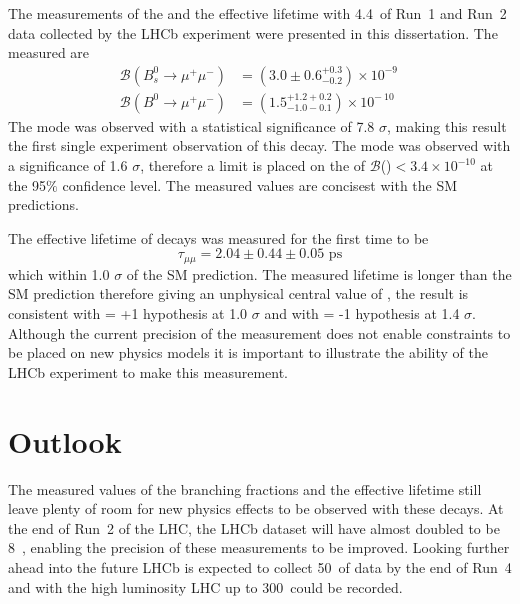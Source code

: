 The measurements of the \bmumu \BF and the \bsmumu effective lifetime with 4.4~\fb of Run~1 and Run~2 data collected by the LHCb experiment were presented in this dissertation. The measured \BFs are
\begin{equation}
\begin{split}
  \mathcal{B}(B^{0}_{s} \to \mu^{+} \mu^{-}) &= (3.0 \pm 0.6^{+0.3}_{-0.2}) \times 10^{-9\
} \\
  \mathcal{B}(B^{0} \to \mu^{+} \mu^{-}) &= (1.5^{+1.2 +0.2}_{-1.0 -0.1})    \times 10^{-\
10}
\end{split}
\label{eq:BFresults2}
\end{equation}
The \bs mode was observed with a statistical significance of 7.8 $\sigma$, making this result the first single experiment observation of this decay. The \bd mode was observed with a significance of 1.6 $\sigma$, therefore a limit is placed on the \BF of $\mathcal{B}$(\bdmumu)$ < 3.4 \times 10^{-10}$ at the 95$\%$ confidence level. The measured values are concisest with the SM predictions. %


The effective lifetime of \bsmumu decays was measured for the first time to be 
\begin{equation}
\tau_{\mu\mu} = 2.04 \pm 0.44 \pm 0.05 \text{ ps}
\end{equation}
which within 1.0 $\sigma$ of the SM prediction. The measured lifetime is longer than the SM prediction therefore giving an unphysical central value of \ADG, the result is consistent with \ADG = +1 hypothesis at 1.0 $\sigma$ and with \ADG = -1 hypothesis at 1.4 $\sigma$. Although the current precision of the measurement does not enable constraints to be placed on new physics models it is important to illustrate the ability of the LHCb experiment to make this measurement.


\section{Outlook}
The measured values of the branching fractions and the effective lifetime still leave plenty of room for new physics effects to be observed with these decays. At the end of Run~2 of the LHC, the LHCb dataset will have almost doubled to be 8~\fb, enabling the precision of these measurements to be improved. Looking further ahead into the future LHCb is expected to collect 50~\fb of data by the end of Run~4 and with the high luminosity LHC up to 300~\fb could be recorded. 

